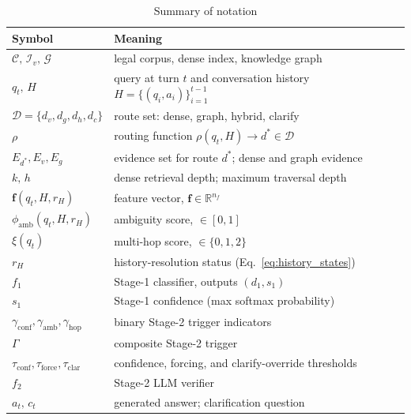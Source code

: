 \documentclass[pdflatex,sn-mathphys-num]{sn-jnl}
\begin{document}
\begin{table}[!htbp]
\centering
\caption{Summary of notation}\label{tab:notation}
\begin{tabularx}{\columnwidth}{L{3cm}Y}
\toprule
\textbf{Symbol} & \textbf{Meaning} \\
\midrule
$\mathcal{C},\,\mathcal{I}_v,\,\mathcal{G}$ & legal corpus, dense index, knowledge graph \\
$q_t,\,H$ & query at turn $t$ and conversation history $H=\{(q_i,a_i)\}_{i=1}^{t-1}$ \\
$\mathcal{D}=\{d_v,d_g,d_h,d_c\}$ & route set: dense, graph, hybrid, clarify \\
$\rho$ & routing function $\rho(q_t,H)\!\to\! d^*\!\in\!\mathcal{D}$ \\
$E_{d^*},E_v,E_g$ & evidence set for route $d^*$; dense and graph evidence \\
$k,\,h$ & dense retrieval depth; maximum traversal depth \\
$\mathbf{f}(q_t,H,r_H)$ & feature vector, $\mathbf{f}\in\mathbb{R}^{n_f}$ \\
$\phi_{\mathrm{amb}}(q_t,H,r_H)$ & ambiguity score, $\in[0,1]$ \\
$\xi(q_t)$ & multi-hop score, $\in\{0,1,2\}$ \\
$r_H$ & history-resolution status (Eq.~\ref{eq:history_states}) \\
$f_1$ & Stage-1 classifier, outputs $(d_1,s_1)$ \\
$s_1$ & Stage-1 confidence (max softmax probability) \\
$\gamma_{\mathrm{conf}},\gamma_{\mathrm{amb}},\gamma_{\mathrm{hop}}$ & binary Stage-2 trigger indicators \\
$\Gamma$ & composite Stage-2 trigger \\
$\tau_{\mathrm{conf}},\tau_{\mathrm{force}},\tau_{\mathrm{clar}}$ & confidence, forcing, and clarify-override thresholds \\
$f_2$ & Stage-2 LLM verifier \\
$a_t,\,c_t$ & generated answer; clarification question \\
\bottomrule
\end{tabularx}
\end{table}
\end{document}
